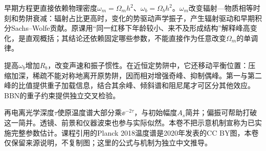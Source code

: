 早期方程更直接依赖物理密度$\omega_m=\Omega_mh^2$、$\omega_b=\Omega_bh^2$。$\omega_m$改变辐射—物质相等时刻和势阱衰减：辐射占比更高时，变化的势驱动声学振子，产生辐射驱动和早期积分Sachs--Wolfe贡献。原课用“同一红移下年龄较小、来不及形成结构”解释峰高变化，是直观概括；其结论还依赖固定哪些参数，不能直接作为任意改变$\Omega_m$的单调律。

提高$\omega_b$增加$R_b$，改变声速和振子惯性。在近恒定势阱中，它还移动平衡位置：压缩加深，稀疏不能对称地离开原势阱，因而相对增强奇峰、抑制偶峰。第一与第二峰的比值提供重子加载信息，结合其余峰、倾斜谱和阻尼尾才可区分其他效应。BBN的重子约束提供独立交叉检验。

再电离光学深度$\tau$使原温度谱大部分乘$\ee^{-2\tau}$，与初始幅度$A_s$简并；偏振可帮助打破这一简并。透镜、前景和仪器波束也参与实际似然。本卷不把示意机制宣称为已实施完整参数估计。课程引用的Planck 2018温度谱是2020年发表的CC BY图，本卷仅保留来源说明，不复制图；这里的公式与机制为独立中文推导。
